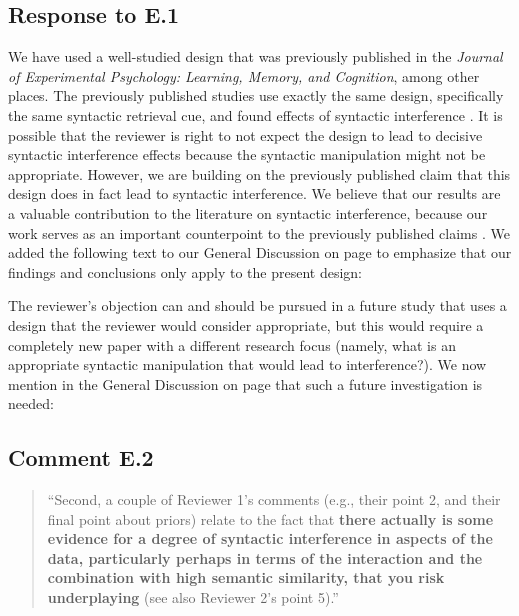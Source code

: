 \documentclass[12pt]{article}
\begin{document}
\subsection*{Response to E.1}
We have used a well-studied design that was previously published in the \textit{Journal of Experimental Psychology: Learning, Memory, and Cognition}, among other places. The previously published studies use exactly the same design, specifically the same syntactic retrieval cue, and found effects of syntactic interference \citep{vandyke07,mertzen}.
It is possible that the reviewer is right to not expect the design to lead to decisive syntactic interference effects because the syntactic manipulation might not be appropriate. However, we are building on the previously published claim that this design does in fact lead to syntactic interference. We believe that our results are a valuable contribution to the literature on syntactic interference, because our work serves as an important counterpoint to the previously published claims \citep{vandyke07, mertzen}. We added the following text to our General Discussion on page \pageref{only_this_design} to emphasize that our findings and conclusions only apply to the present design:

\begin{quote}
\end{quote}

The reviewer's objection can and should be pursued in a future study that uses a design that the reviewer would consider appropriate, but this would require a completely new paper with a different research focus (namely, what is an appropriate syntactic manipulation that would lead to interference?). We now mention in the General Discussion on page \pageref{future_work}
that such a future investigation is needed:

\begin{quote}
\end{quote}

\subsection*{Comment E.2}

\begin{quote}
``Second, a couple of Reviewer 1's comments (e.g., their point 2, and their final point about priors) relate to the fact that \textbf{there actually is some evidence for a degree of syntactic interference in aspects of the data, particularly perhaps in terms of the interaction and the combination with high semantic similarity, that you risk underplaying} (see also Reviewer 2's point 5).''
\end{quote}
\end{document}
